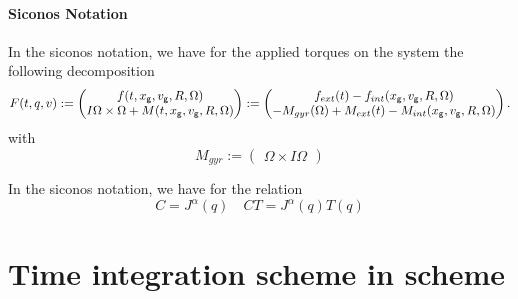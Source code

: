\paragraph{Siconos Notation} In the siconos notation, we have for the applied torques on the system the following decomposition
\begin{equation}
  F(t,q,v):= \begin{pmatrix}
    f(t,x_{\sf \small g},  v_{\sf \small g}, R, \Omega ) \\
    I \Omega \times \Omega + M(t,x_{\sf \small g}, v_{\sf \small g}, R, \Omega )
  \end{pmatrix}
  := \begin{pmatrix}
    f_{ext}(t)  - f_{int}(x_{\sf \small g},  v_{\sf \small g}, R, \Omega ) \\
    - M_{gyr}(\Omega) + M_{ext}(t) -  M_{int}(x_{\sf \small g}, v_{\sf \small g}, R, \Omega )
  \end{pmatrix}.
\end{equation}
with
\begin{equation}
  M_{gyr} := \begin{pmatrix}
     \Omega \times I\Omega
  \end{pmatrix}
\end{equation}



In the siconos notation, we have for the relation
\begin{equation}
  \label{eq:100}
   C =   J^\alpha(q) \quad CT = J^\alpha(q)T(q)
\end{equation}







\section{Time integration scheme in scheme}


